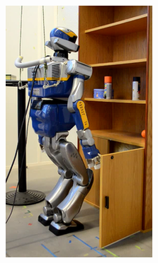 \begin{figure}
  \centering
  \begin{subfigure}{0.19\columnwidth}
    \centering
    \includegraphics[width = \columnwidth]
                    {src/chap3-optimal-motion-planning/figure/shelves-1.png}
    \label{shelves-1}
  \end{subfigure}
  \begin{subfigure}{0.19\columnwidth}
    \centering

\end{subfigure}
\end{figure}
